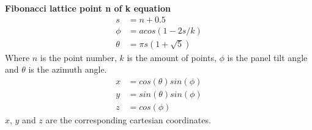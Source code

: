 
\noindent \textbf{Fibonacci lattice point n of k equation}
\begin{align}
	s &= n + 0.5 \\
	\phi &= acos(1 - 2 s / k) \\
	\theta &= \pi s (1 + \sqrt{5})
\end{align}
Where $n$ is the point number, $k$ is the amount of points, $\phi$ is the panel tilt angle and $\theta$ is the azimuth angle.
\begin{align}
	x &= cos(\theta)sin(\phi)\\
	y &= sin(\theta)sin(\phi)\\
	z &= cos(\phi)
\end{align}
$x$, $y$ and $z$ are the corresponding cartesian coordinates.
\vspace{5mm}


